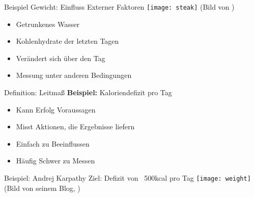 \begin{frame}[c]{Beispiel Gewicht: Einfluss Externer Faktoren}
    \small
    \texttt{[image: steak]}
    (Bild von \cite{steak-pic})
    \large
    \begin{itemize}[<+(1)->]
        \item Getrunkenes Wasser
        \item Kohlenhydrate der letzten Tagen
        \item Verändert sich über den Tag
        \item Messung unter anderen Bedingungen
    \end{itemize}
\end{frame}

\begin{frame}[c]{Definition: Leitmaß}
    \large
    \pause
    \textbf{Beispiel:} Kaloriendefizit pro Tag
    \begin{itemize}[<+(1)->]
        \item Kann Erfolg Voraussagen
        \item Misst Aktionen, die Ergebnisse liefern
        \item Einfach zu Beeinflussen
        \item Häufig Schwer zu Messen
    \end{itemize}
\end{frame}


\begin{frame}[c]{Beispiel: Andrej Karpathy}
    \large
    Ziel: Defizit von ~500kcal pro Tag
    \texttt{[image: weight]} \\
    (Bild von seinem Blog, \cite{weight-pic})
\end{frame}




